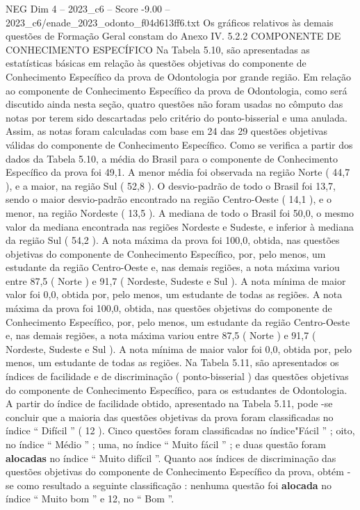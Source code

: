 \begin{textsample}{NEG Dim 4 – 2023\_c6 – Score -9.00 – 2023\_c6/enade\_2023\_odonto\_f04d613ff6.txt}
Os gráficos relativos às demais questões de Formação Geral constam do Anexo IV. 5.2.2 COMPONENTE DE CONHECIMENTO ESPECÍFICO Na Tabela 5.10, são apresentadas as estatísticas básicas em relação às questões objetivas do componente de Conhecimento Específico da prova de Odontologia por grande região.
Em relação ao componente de Conhecimento Específico da prova de Odontologia, como será discutido ainda nesta seção, quatro questões não foram usadas no cômputo das notas por terem sido descartadas pelo critério do ponto-bisserial e uma anulada.
Assim, as notas foram calculadas com base em 24 das 29 questões objetivas válidas do componente de Conhecimento Específico.
Como se verifica a partir dos dados da Tabela 5.10, a média do Brasil para o componente de Conhecimento Específico da prova foi 49,1.
A menor média foi observada na região Norte ( 44,7 ), e a maior, na região Sul ( 52,8 ).
O desvio-padrão de todo o Brasil foi 13,7, sendo o maior desvio-padrão encontrado na região Centro-Oeste ( 14,1 ), e o menor, na região Nordeste ( 13,5 ).
A mediana de todo o Brasil foi 50,0, o mesmo valor da mediana encontrada nas regiões Nordeste e Sudeste, e inferior à mediana da região Sul ( 54,2 ).
A nota máxima da prova foi 100,0, obtida, nas questões objetivas do componente de Conhecimento Específico, por, pelo menos, um estudante da região Centro-Oeste e, nas demais regiões, a nota máxima variou entre 87,5 ( Norte ) e 91,7 ( Nordeste, Sudeste e Sul ).
A nota mínima de maior valor foi 0,0, obtida por, pelo menos, um estudante de todas as regiões.
A nota máxima da prova foi 100,0, obtida, nas questões objetivas do componente de Conhecimento Específico, por, pelo menos, um estudante da região Centro-Oeste e, nas demais regiões, a nota máxima variou entre 87,5 ( Norte ) e 91,7 ( Nordeste, Sudeste e Sul ).
A nota mínima de maior valor foi 0,0, obtida por, pelo menos, um estudante de todas as regiões.
Na Tabela 5.11, são apresentados os índices de facilidade e de discriminação ( ponto-bisserial ) das questões objetivas do componente de Conhecimento Específico, para os estudantes de Odontologia.
A partir do índice de facilidade obtido, apresentado na Tabela 5.11, pode -se concluir que a maioria das questões objetivas da prova foram classificadas no índice “ Difícil ” ( 12 ).
Cinco questões foram classificadas no índice"Fácil ” ; oito, no índice “ Médio ” ; uma, no índice “ Muito fácil ” ; e duas questão foram \textbf{alocadas} no índice “ Muito difícil ”.
Quanto aos índices de discriminação das questões objetivas do componente de Conhecimento Específico da prova, obtém -se como resultado a seguinte classificação : nenhuma questão foi \textbf{alocada} no índice “ Muito bom ” e 12, no “ Bom ”.

\end{textsample}
